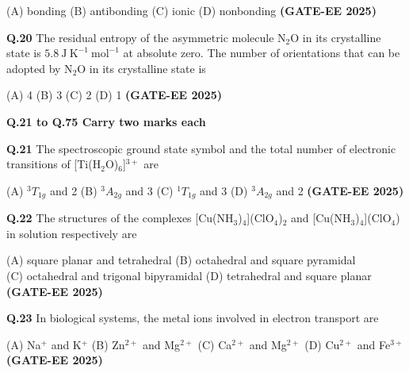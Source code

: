 \documentclass[12pt]{article}
\begin{document}
\begin{enumerate}
(A) bonding \hspace{1cm}
(B) antibonding \hspace{1cm}
(C) ionic \hspace{1cm}
(D) nonbonding   \textbf{(GATE-EE 2025)}


\vspace{0.5cm}

\textbf{Q.20} The residual entropy of the asymmetric molecule N$_2$O in its crystalline state is $5.8\ \mathrm{J\ K^{-1}\ mol^{-1}}$ at absolute zero. The number of orientations that can be adopted by N$_2$O in its crystalline state is

(A) 4 \hspace{1cm}
(B) 3 \hspace{1cm}
(C) 2 \hspace{1cm}
(D) 1   \textbf{(GATE-EE 2025)}


\vspace{0.5cm}

\textbf{Q.21 to Q.75 Carry two marks each}

\vspace{0.5cm}

\textbf{Q.21} The spectroscopic ground state symbol and the total number of electronic transitions of [Ti(H$_2$O)$_6$]$^{3+}$ are

(A) $^3T_{1g}$ and 2 \hspace{1cm}
(B) $^3A_{2g}$ and 3 \hspace{1cm}
(C) $^1T_{1g}$ and 3 \hspace{1cm}
(D) $^3A_{2g}$ and 2   \textbf{(GATE-EE 2025)}


\vspace{0.5cm}

\textbf{Q.22} The structures of the complexes [Cu(NH$_3$)$_4$](ClO$_4$)$_2$ and [Cu(NH$_3$)$_4$](ClO$_4$) in solution respectively are

(A) square planar and tetrahedral \hspace{1cm}
(B) octahedral and square pyramidal\\
(C) octahedral and trigonal bipyramidal \hspace{1cm}
(D) tetrahedral and square planar   \textbf{(GATE-EE 2025)}


\vspace{0.5cm}

\textbf{Q.23} In biological systems, the metal ions involved in electron transport are

(A) Na$^+$ and K$^+$ \hspace{1cm}
(B) Zn$^{2+}$ and Mg$^{2+}$ \hspace{1cm}
(C) Ca$^{2+}$ and Mg$^{2+}$ \hspace{1cm}
(D) Cu$^{2+}$ and Fe$^{3+}$   \textbf{(GATE-EE 2025)}



\end{enumerate}
\end{document}
